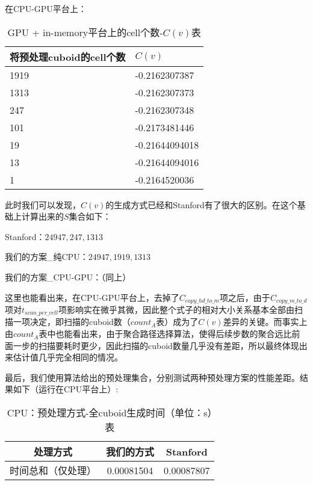在CPU-GPU平台上：

\begin{table}[!htbp]
\centering
\caption{GPU + in-memory平台上的cell个数-$C(v)$表} 
\label{tab:table17}
\begin{tabular}{|l|l|}
    \hline
    将预处理cuboid的cell个数 & $C(v)$\\
    \hline
    1919 & -0.2162307387\\
    \hline
    1313 & -0.2162307373\\
    \hline
    247 & -0.2162307348\\
    \hline
    101 & -0.2173481446\\
    \hline
    19 & -0.21644094018\\
    \hline
    13 & -0.21644094016\\
    \hline
    1 & -0.2164520036\\
    \hline
\end{tabular}
\end{table}

此时我们可以发现，$C(v)$的生成方式已经和Stanford有了很大的区别。在这个基础上计算出来的$S$集合如下：

Stanford：${24947, 247, 1313}$

我们的方案\_纯CPU：${24947, 1919, 1313}$

我们的方案\_CPU-GPU：（同上）

这里也能看出来，在CPU-GPU平台上，去掉了$C_{copy\_hd\_to\_m}$项之后，由于$C_{copy\_m\_to\_d}$项对$t_{scan\_per\_cell}$项影响实在微乎其微，因此整个式子的相对大小关系基本全部由扫描一项决定，即扫描的cuboid数（$count_A$表）成为了$C(v)$差异的关键。而事实上由$count_A$表中也能看出来，由于聚合路径选择算法，使得后续步数的聚合远比前面一步的扫描要耗时更少，因此扫描的cuboid数量几乎没有差距，所以最终体现出来估计值几乎完全相同的情况。

最后，我们使用算法给出的预处理集合，分别测试两种预处理方案的性能差距。结果如下（运行在CPU平台上）:

\begin{table}[!htbp]
\centering
\caption{CPU：预处理方式-全cuboid生成时间（单位：s）表} 
\label{tab:table18}
\begin{tabular}{|c|c|c|}
    \hline
    处理方式 & 我们的方式 & Stanford\\
    \hline
    时间总和（仅处理） & 0.00081504 & 0.00087807\\
    \hline
\end{tabular}
\end{table}

